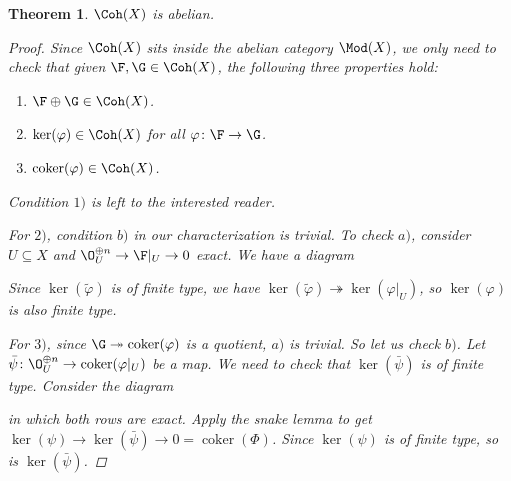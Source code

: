 \documentclass[A4paper, british]{amsart}
\theoremstyle{darkgreentheorem}
\newtheorem{thm}{Theorem}[section]
\theoremstyle{darkbluedefinition}
\theoremstyle{darkredexample}
\theoremstyle{remark}
\DeclareMathOperator{\im}{im}
\DeclareMathOperator{\coker}{coker}
\newcommand{\1}{\mathbbm{1}}
\newcommand{\op}{\oplus}
\newcommand{\sub}{\subseteq}
\newcommand{\epi}{\twoheadrightarrow}
\begin{document}
\begin{thm}
    $\Coh(X)$ is abelian.
    \begin{proof}
	Since $\Coh(X)$ sits inside the abelian category $\Mod(X)$, we only need to check that given $\F,\G\in \Coh(X)$, the following three properties hold:
	\begin{enumerate}
	    \item $\F\op \G\in \Coh(X)$.
	    \item $\ker(\varphi)\in \Coh(X)$ for all $\varphi\colon \F\to \G$.
	    \item $\coker(\varphi)\in \Coh(X)$.
	\end{enumerate}
	Condition $1)$ is left to the interested reader.

	For $2)$, condition $b)$ in our characterization is trivial.
	To check $a)$, consider $U\sub X$ and $\O_{U}^{\op n}\to \F|_{U}\to 0$ exact.
	We have a diagram
	\begin{center}
	\end{center}
	Since $\ker(\tilde{\varphi})$ is of finite type, we have $\ker(\tilde{\varphi})\epi \ker(\varphi|_{U})$, so $\ker(\varphi)$ is also finite type.
	
	For $3)$, since $\G\epi \coker(\varphi)$ is a quotient, $a)$ is trivial.
	So let us check $b)$.
	Let $\bar{\psi}\colon \O_{U}^{\op n}\to \coker(\varphi|_{U})$ be a map.
	We need to check that $\ker(\bar{\psi})$ is of finite type.
	Consider the diagram
	\begin{center}
	\end{center}
	in which both rows are exact.
	Apply the snake lemma to get $\ker(\psi)\to \ker(\bar{\psi})\to 0=\coker(\Phi)$.
	Since $\ker(\psi)$ is of finite type, so is $\ker(\bar{\psi})$.
    \end{proof}
\end{thm}
\end{document}
